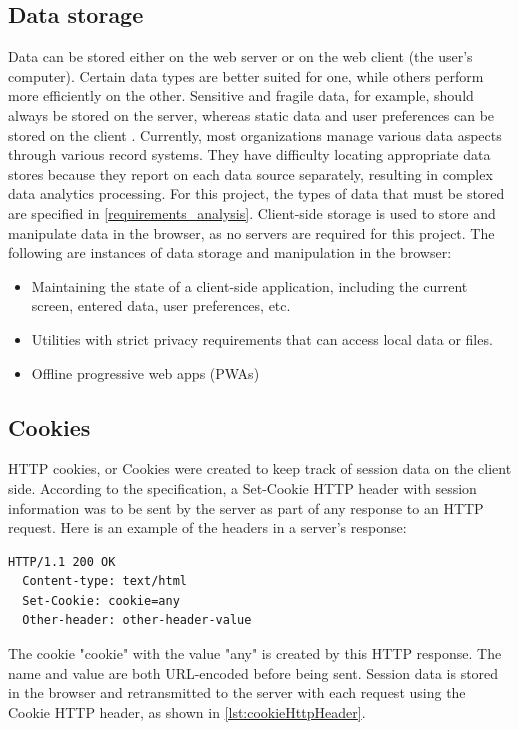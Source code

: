 \subsection{Data storage}
Data can be stored either on the web server or on the web client (the user's computer). Certain data types are better suited for one, while others perform more efficiently on the other. Sensitive and fragile data, for example, should always be stored on the server, whereas static data and user preferences can be stored on the client \autocite{macdonald2013html5}. Currently, most organizations manage various data aspects through various record systems. They have difficulty locating appropriate data stores because they report on each data source separately, resulting in complex data analytics processing. For this project, the types of data that must be stored are specified in \autoref{requirements_analysis}. Client-side storage is used to store and manipulate data in the browser, as no servers are required for this project. The following are instances of data storage and manipulation in the browser:

\begin{itemize}
  \item Maintaining the state of a client-side application, including the current screen, entered data, user preferences, etc.
  \item Utilities with strict privacy requirements that can access local data or files.
  \item Offline progressive web apps (PWAs)
\end{itemize}

\subsection*{Cookies}
HTTP cookies, or Cookies were created to keep track of session data on the client side. According to the specification, a Set-Cookie HTTP header with session information was to be sent by the server as part of any response to an HTTP request. Here is an example of the headers in a server's response:

\begin{lstlisting}[language={}, caption={Cookie server response's headers}]
  HTTP/1.1 200 OK
  Content-type: text/html
  Set-Cookie: cookie=any
  Other-header: other-header-value
\end{lstlisting}

The cookie "cookie" with the value "any" is created by this HTTP response. The name and value are both URL-encoded before being sent. Session data is stored in the browser and retransmitted to the server with each request using the Cookie HTTP header, as shown in \autoref{lst:cookieHttpHeader}.

